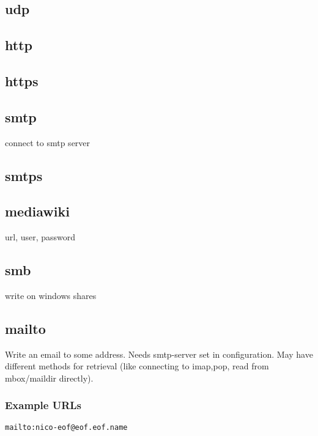\documentclass[12pt,a4paper]{book}
\begin{document}
\subsection{udp}
\subsection{http}
\subsection{https}
\subsection{smtp}
connect to smtp server
\subsection{smtps}
\subsection{mediawiki}
url, user, password
\subsection{smb}
write on windows shares
\subsection{mailto}
Write an email to some address. Needs smtp-server set in configuration.
May have different methods for retrieval (like connecting to imap,pop,
read from mbox/maildir directly).
\subsubsection{Example URLs}
\begin{verbatim}
mailto:nico-eof@eof.eof.name
\end{verbatim}
\end{document}
